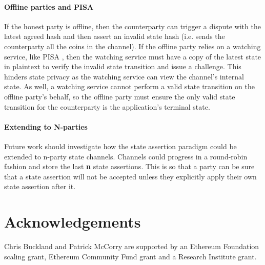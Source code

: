 \documentclass{llncs}
\newcommand{\chanblue}{\textcolor{entry}{\bf SC}}
\newcommand{\timeoutblue}{\textcolor{entry}{\bf timeout}}
\begin{document}
\paragraph{Offline parties and PISA} 
If the honest party is offline, then the counterparty can trigger a dispute with the latest agreed hash and then assert an invalid state hash (i.e. sends the counterparty all the coins in the channel).
If the offline party relies on a watching service, like PISA \cite{mccorry2018pisa}, then the watching service must have a copy of the latest state in plaintext to verify the invalid state transition and issue a challenge.
This hinders state privacy as the watching service can view the channel's internal state. 
As well, a watching service cannot perform a valid state transition on the offline party's behalf, so the offline party must ensure the only valid state transition for the counterparty is the application's terminal state. 


\paragraph{Extending to N-parties}
Future work should investigate how the state assertion paradigm could be extended to n-party state channels. Channels could progress in a round-robin fashion and store the last \textbf{n} state assertions. This is so that a party can be sure that a state assertion will not be accepted unless they explicitly apply their own state assertion after it.

\section{Acknowledgements} Chris Buckland and Patrick McCorry are supported by an Ethereum Foundation
scaling grant, Ethereum Community Fund grant and a Research Institute grant.




%
\end{document}
